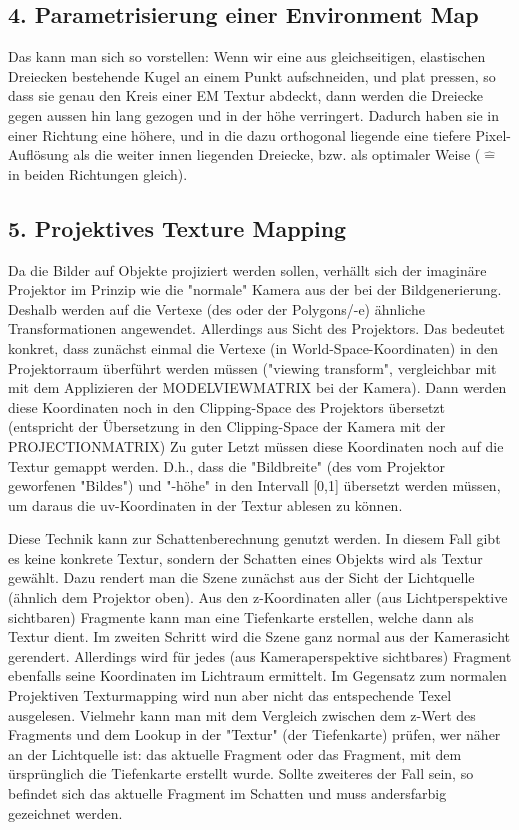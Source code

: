 \documentclass[a4paper,headings=small]{scrartcl}
\numberwithin{equation}{section} %
\numberwithin{figure}{section}   %
\begin{document}
\subsection*{4. Parametrisierung einer Environment Map}
Das kann man sich so vorstellen:
Wenn wir eine aus gleichseitigen, elastischen Dreiecken bestehende Kugel an einem Punkt aufschneiden,
und plat pressen,
so dass sie genau den Kreis einer EM Textur abdeckt,
dann werden die Dreiecke gegen aussen hin lang gezogen und in der höhe verringert.
Dadurch haben sie in einer Richtung eine höhere,
und in die dazu orthogonal liegende eine tiefere Pixel-Auflösung als die weiter innen liegenden Dreiecke,
bzw. als optimaler Weise ($\hat{=}$ in beiden Richtungen gleich).


\subsection*{5. Projektives Texture Mapping}
Da die Bilder auf Objekte projiziert werden sollen, verhällt sich der imaginäre Projektor im Prinzip wie die "normale" Kamera aus der bei der Bildgenerierung.
Deshalb werden auf die Vertexe (des oder der Polygons/-e) ähnliche Transformationen angewendet.
Allerdings aus Sicht des Projektors.
Das bedeutet konkret, dass zunächst einmal die Vertexe (in World-Space-Koordinaten) in den Projektorraum überführt werden müssen ("viewing transform", vergleichbar mit mit dem Applizieren der MODELVIEWMATRIX bei der Kamera).
Dann werden diese Koordinaten noch in den Clipping-Space des Projektors übersetzt (entspricht der Übersetzung in den Clipping-Space der Kamera mit der PROJECTIONMATRIX)
Zu guter Letzt müssen diese Koordinaten noch auf die Textur gemappt werden.
D.h., dass die "Bildbreite" (des vom Projektor geworfenen "Bildes") und "-höhe" in den Intervall [0,1] übersetzt werden müssen, um daraus die uv-Koordinaten in der Textur ablesen zu können.

Diese Technik kann zur Schattenberechnung genutzt werden. In diesem Fall gibt es keine konkrete Textur, sondern der Schatten eines Objekts wird als Textur gewählt.
Dazu rendert man die Szene zunächst aus der Sicht der Lichtquelle (ähnlich dem Projektor oben).
Aus den z-Koordinaten aller (aus Lichtperspektive sichtbaren) Fragmente kann man eine Tiefenkarte erstellen, welche dann als Textur dient.
Im zweiten Schritt wird die Szene ganz normal aus der Kamerasicht gerendert.
Allerdings wird für jedes (aus Kameraperspektive sichtbares) Fragment ebenfalls seine Koordinaten im Lichtraum ermittelt.
Im Gegensatz zum normalen Projektiven Texturmapping wird nun aber nicht das entspechende Texel ausgelesen.
Vielmehr kann man mit dem Vergleich zwischen dem z-Wert des Fragments und dem Lookup in der "Textur" (der Tiefenkarte) prüfen, wer näher an der Lichtquelle ist: das aktuelle Fragment oder das Fragment, mit dem ürsprünglich die Tiefenkarte erstellt wurde. Sollte zweiteres der Fall sein, so befindet sich das aktuelle Fragment im Schatten und muss andersfarbig gezeichnet werden.
\end{document}
